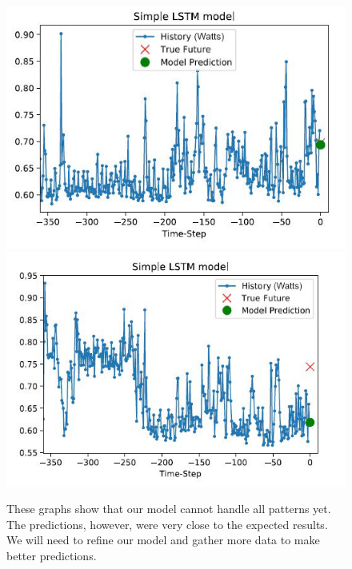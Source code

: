 \documentclass[conference]{IEEEtran}
\begin{document}
\begin{figure}[ht]
    \includegraphics[width=\linewidth]{img/prediction02.jpg}
    \includegraphics[width=\linewidth]{img/prediction03.jpg}
    \caption{These graphs show that our model cannot handle all patterns yet. The predictions, however, were very close to the expected results. We will need to refine our model and gather more data to make better predictions.}
    \label{fig:prediction02}
\end{figure}
\end{document}
